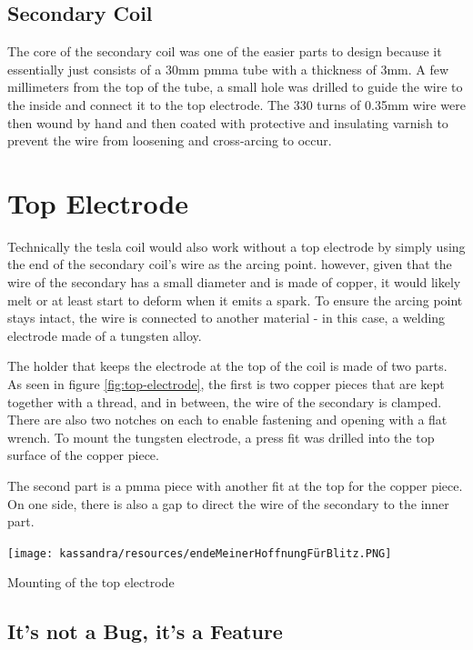 \subsection{Secondary Coil}

The core of the secondary coil was one of the easier parts to design because it essentially just consists of a 30mm \gls{pmma} tube with a thickness of 3mm. A few millimeters from the top of the tube, a small hole was drilled to guide the wire to the inside and connect it to the top electrode. The 330 turns of 0.35mm wire were then wound by hand and then coated with protective and insulating varnish to prevent the wire from loosening and cross-arcing to occur.


\section{Top Electrode}

Technically the tesla coil would also work without a top electrode by simply using the end of the secondary coil's wire as the arcing point. however, given that the wire of the secondary has a small diameter and is made of copper, it would likely melt or at least start to deform when it emits a spark. To ensure the arcing point stays intact, the wire is connected to another material - in this case, a welding electrode made of a tungsten alloy. 

The holder that keeps the electrode at the top of the coil is made of two parts. As seen in figure \ref{fig:top-electrode}, the first is two copper pieces that are kept together with a thread, and in between, the wire of the secondary is clamped. There are also two notches on each to enable fastening and opening with a flat wrench. To mount the tungsten electrode, a press fit was drilled into the top surface of the copper piece. 

The second part is a \gls{pmma} piece with another fit at the top for the copper piece. On one side, there is also a gap to direct the wire of the secondary to the inner part. 

\begin{marginfigure}[-8cm]
    \centering
    \texttt{[image: kassandra/resources/endeMeinerHoffnungFürBlitz.PNG]}
    \caption{Mounting of the top electrode}
    \label{fig:top-electrode}
\end{marginfigure}

\subsection{It's not a Bug, it's a Feature}

